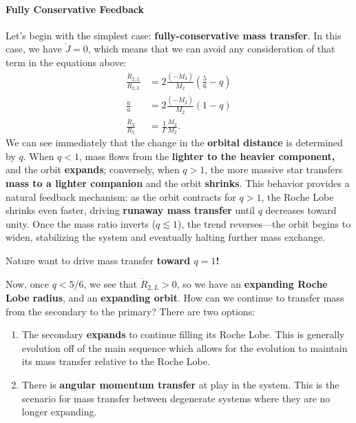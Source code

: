 \paragraph{Fully Conservative Feedback}
Let's begin with the simplest case: \textbf{fully-conservative mass transfer}. In this case, we have $\dot{J} = 0$, which means that we can avoid any consideration of that term in the equations above:
\[
\begin{aligned}
    \frac{\dot{R}_{2,L}}{R_{2,L}} &= 2\frac{(-\dot{M}_2)}{M_2}\left(\frac{5}{6}-q\right)\\
    \frac{\dot{a}}{a} &= 2\frac{(-\dot{M}_2)}{M_2}\left(1-q\right)\\
    \frac{\dot{R}_2}{R_2} &= \frac{1}{\Gamma} \frac{\dot{M}_2}{M_2}.
\end{aligned}
\]
We can see immediately that the change in the \textbf{orbital distance} is determined by $q$. When $q < 1$, mass flows from the \textbf{lighter to the heavier component,} and the orbit \textbf{expands}; conversely, when $q > 1$, the more massive star transfers \textbf{mass to a lighter companion} and the orbit \textbf{shrinks}.  This behavior provides a natural feedback mechanism: as the orbit contracts for $q > 1$, the Roche Lobe shrinks even faster, driving \textbf{runaway mass transfer} until $q$ decreases toward unity.  Once the mass ratio inverts ($q \lesssim 1$), the trend reverses—the orbit begins to widen, stabilizing the system and eventually halting further mass exchange.  
\begin{bigidea}
    Nature want to drive mass transfer \textbf{toward $q = 1$!}
\end{bigidea}
Now, once $q < 5/6$, we see that $\dot{R}_{2,L}>0$, so we have an \textbf{expanding Roche Lobe radius}, and an \textbf{expanding orbit}. How can we continue to transfer mass from the secondary to the primary? There are two options:
\vspace{10pt}
\par
\begin{enumerate}
    \item The secondary \textbf{expands} to continue filling its Roche Lobe. This is generally evolution off of the main sequence which allows for the evolution to maintain its mass transfer relative to the Roche Lobe.
    \item There is \textbf{angular momentum transfer} at play in the system. This is the scenario for mass transfer between degenerate systems where they are no longer expanding.
\end{enumerate}

